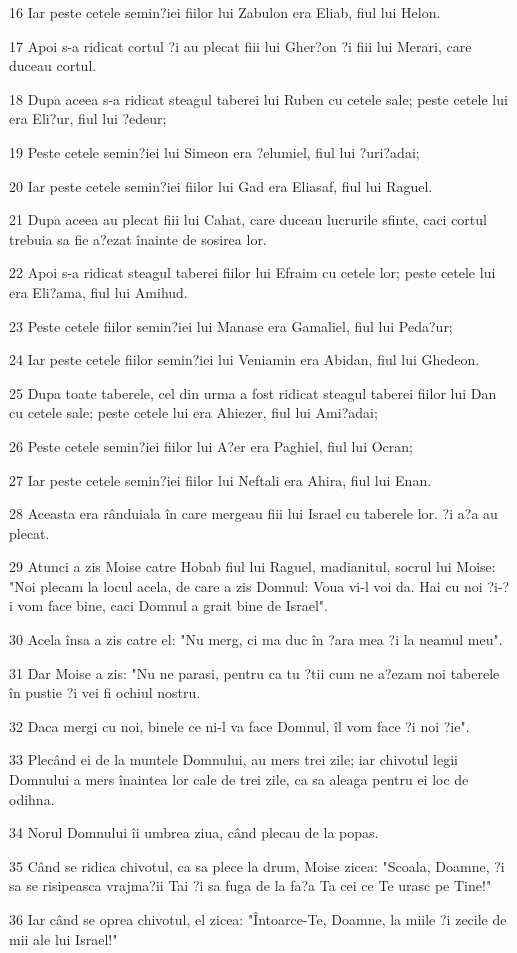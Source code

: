 \par 16 Iar peste cetele semin?iei fiilor lui Zabulon era Eliab, fiul lui Helon.
\par 17 Apoi s-a ridicat cortul ?i au plecat fiii lui Gher?on ?i fiii lui Merari, care duceau cortul.
\par 18 Dupa aceea s-a ridicat steagul taberei lui Ruben cu cetele sale; peste cetele lui era Eli?ur, fiul lui ?edeur;
\par 19 Peste cetele semin?iei lui Simeon era ?elumiel, fiul lui ?uri?adai;
\par 20 Iar peste cetele semin?iei fiilor lui Gad era Eliasaf, fiul lui Raguel.
\par 21 Dupa aceea au plecat fiii lui Cahat, care duceau lucrurile sfinte, caci cortul trebuia sa fie a?ezat înainte de sosirea lor.
\par 22 Apoi s-a ridicat steagul taberei fiilor lui Efraim cu cetele lor; peste cetele lui era Eli?ama, fiul lui Amihud.
\par 23 Peste cetele fiilor semin?iei lui Manase era Gamaliel, fiul lui Peda?ur;
\par 24 Iar peste cetele fiilor semin?iei lui Veniamin era Abidan, fiul lui Ghedeon.
\par 25 Dupa toate taberele, cel din urma a fost ridicat steagul taberei fiilor lui Dan cu cetele sale; peste cetele lui era Ahiezer, fiul lui Ami?adai;
\par 26 Peste cetele semin?iei fiilor lui A?er era Paghiel, fiul lui Ocran;
\par 27 Iar peste cetele semin?iei fiilor lui Neftali era Ahira, fiul lui Enan.
\par 28 Aceasta era rânduiala în care mergeau fiii lui Israel cu taberele lor. ?i a?a au plecat.
\par 29 Atunci a zis Moise catre Hobab fiul lui Raguel, madianitul, socrul lui Moise: "Noi plecam la locul acela, de care a zis Domnul: Voua vi-l voi da. Hai cu noi ?i-?i vom face bine, caci Domnul a grait bine de Israel".
\par 30 Acela însa a zis catre el: "Nu merg, ci ma duc în ?ara mea ?i la neamul meu".
\par 31 Dar Moise a zis: "Nu ne parasi, pentru ca tu ?tii cum ne a?ezam noi taberele în pustie ?i vei fi ochiul nostru.
\par 32 Daca mergi cu noi, binele ce ni-l va face Domnul, îl vom face ?i noi ?ie".
\par 33 Plecând ei de la muntele Domnului, au mers trei zile; iar chivotul legii Domnului a mers înaintea lor cale de trei zile, ca sa aleaga pentru ei loc de odihna.
\par 34 Norul Domnului îi umbrea ziua, când plecau de la popas.
\par 35 Când se ridica chivotul, ca sa plece la drum, Moise zicea: "Scoala, Doamne, ?i sa se risipeasca vrajma?ii Tai ?i sa fuga de la fa?a Ta cei ce Te urasc pe Tine!"
\par 36 Iar când se oprea chivotul, el zicea: "Întoarce-Te, Doamne, la miile ?i zecile de mii ale lui Israel!"

